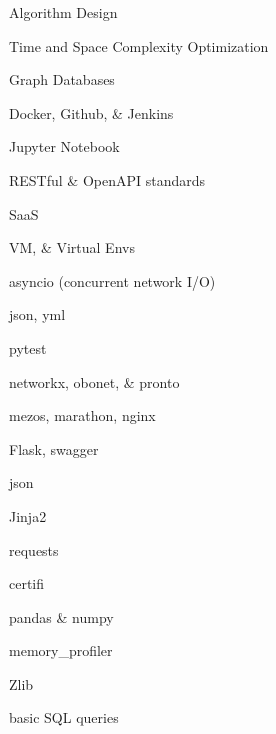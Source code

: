\documentclass[letterpaper,final]{memoir}
\newcommand{\Sep}{\vspace{1.0em}}
\begin{document}
\begin{multicols}{2}

    \begin{compactitem}[\color{Blue}$\circ$]
		
		\item Algorithm Design
        
        \item Time and Space Complexity Optimization
        
        \item Graph Databases
		
        \item Docker, Github, \& Jenkins
        
        \item Jupyter Notebook
        
        \item RESTful \& OpenAPI standards
        
        \item SaaS
		
        \item VM, \& Virtual Envs
        
        \item asyncio (concurrent network I/O)
        
        \item json, yml
        
        \item pytest
        
        \item networkx, obonet, \& pronto
  
        \item mezos, marathon, nginx
        
        \item Flask, swagger
        
        \item json
        
        \item Jinja2
        
        \item requests
        
        \item certifi

        \item pandas \& numpy
        
        \item memory\_profiler
        
        \item Zlib
        
        \item basic SQL queries
      
    \end{compactitem}

\end{multicols}
\Sep
\end{document}
